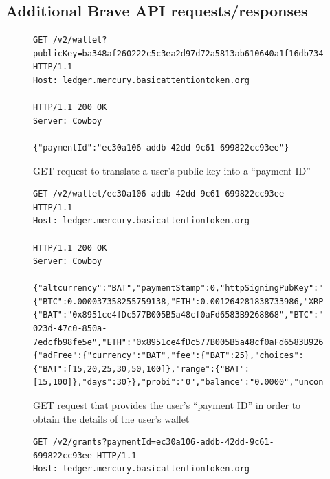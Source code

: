 \documentclass[sigconf]{acmart}
\begin{document}



\begin{appendices}
\section{Additional Brave API requests/responses}
\label{app:addition_brave_api_stuff}
\begin{figure}
\begin{lstlisting}
GET /v2/wallet?publicKey=ba348af260222c5c3ea2d97d72a5813ab610640a1f16db734b56842e70cd6417 HTTP/1.1
Host: ledger.mercury.basicattentiontoken.org

HTTP/1.1 200 OK
Server: Cowboy

{"paymentId":"ec30a106-addb-42dd-9c61-699822cc93ee"}
\end{lstlisting}
\caption{GET request to translate a user's public key into a ``payment ID''}
\label{fig:get_pk2PID}
\end{figure}

\begin{figure}
\begin{lstlisting}
GET /v2/wallet/ec30a106-addb-42dd-9c61-699822cc93ee HTTP/1.1
Host: ledger.mercury.basicattentiontoken.org

HTTP/1.1 200 OK
Server: Cowboy

{"altcurrency":"BAT","paymentStamp":0,"httpSigningPubKey":"ba348af260222c5c3ea2d97d72a5813ab610640a1f16db734b56842e70cd6417","rates":{"BTC":0.000037358255759138,"ETH":0.001264281838733986,"XRP":0.38580204778156996,"BCH":0.000805039347408829,"LTC":0.00470216306156406,"DASH":0.00157272458418419,"BTG":0.007597345360186445,"USD":0.15099318,"EUR":0.133160885442},"addresses":{"BAT":"0x8951ce4fDc577B005B5a48cf0aFd6583B9268868","BTC":"1BSLxGDQdT2zqzoggnAHpgYsuqdwndXiPy","CARD_ID":"453832fc-023d-47c0-850a-7edcfb98fe5e","ETH":"0x8951ce4fDc577B005B5a48cf0aFd6583B9268868","LTC":"Li3Mtjp7S4FfqQXxseE3H67PSbRf1hjQn7"},"parameters":{"adFree":{"currency":"BAT","fee":{"BAT":25},"choices":{"BAT":[15,20,25,30,50,100]},"range":{"BAT":[15,100]},"days":30}},"probi":"0","balance":"0.0000","unconfirmed":"0.0000"}
\end{lstlisting}
\caption{GET request that provides the user's ``payment ID'' in order to obtain the details of the user's wallet }
\label{fig:get_PID2wallet}
\end{figure}

\begin{figure}
\begin{lstlisting}
GET /v2/grants?paymentId=ec30a106-addb-42dd-9c61-699822cc93ee HTTP/1.1
Host: ledger.mercury.basicattentiontoken.org


\end{lstlisting}
\end{figure}
\end{appendices}
\end{document}
